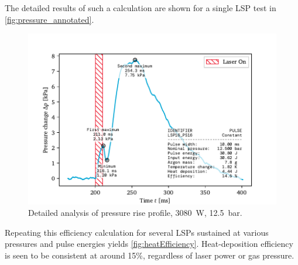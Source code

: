            The detailed results of such a calculation are shown for a single LSP test in \autoref{fig:pressure_annotated}.

            \begin{figure}[h]
                \centering
                \includegraphics[]{assets/5 results/pressure_an_LSP16_PS16}
                \caption[Detailed analysis of pressure rise profile]{Detailed analysis of pressure rise profile, \qty{3080}{W}, \qty{12.5}{bar}.}
                \label{fig:pressure_annotated}
            \end{figure}


            Repeating this efficiency calculation for several LSPs sustained at various pressures and pulse energies yields \autoref{fig:heatEfficiency}. Heat-deposition efficiency is seen to be consistent at around 15\%, regardless of laser power or gas pressure. 
            
